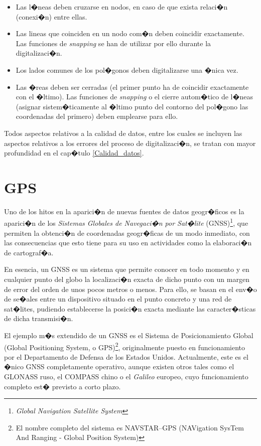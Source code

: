 \begin{itemize}
	\item Las l�neas deben cruzarse en nodos, en caso de que exista relaci�n (conexi�n) entre ellas.
	\item Las lineas que coinciden en un nodo com�n deben coincidir exactamente. Las funciones de \emph{snapping} se han de utilizar por ello durante la digitalizaci�n.
	\item Los lados comunes de los pol�gonos deben digitalizarse una �nica vez.
	\item Las �reas deben ser cerradas (el primer punto ha de coincidir exactamente con el �ltimo). Las funciones de \emph{snapping} o el cierre autom�tico de l�neas (asignar sistem�ticamente al �ltimo punto del contorno del pol�gono las coordenadas del primero) deben emplearse para ello.
\end{itemize}

Todos aspectos relativos a la calidad de datos, entre los cuales se incluyen las aspectos relativos a los errores del proceso de digitalizaci�n, se tratan con mayor profundidad en el cap�tulo \ref{Calidad_datos}.


\section{GPS}
\label{GPS}

Uno de los hitos en la aparici�n de nuevas fuentes de datos geogr�ficos es la aparici�n de los \emph{Sistemas Globales de Navegaci�n por Sat�lite} (GNSS)\footnote{\emph{Global Navigation Satellite System}}, que permiten la obtenci�n de coordenadas geogr�ficas de un modo inmediato, con las consecuencias que esto tiene para su uso en actividades como la elaboraci�n de cartograf�a.

En esencia, un GNSS es un sistema que permite conocer en todo momento y en cualquier punto del globo la localizaci�n exacta de dicho punto con un margen de error del orden de unos pocos metros o menos. Para ello, se basan en el env�o de se�ales entre un dispositivo situado en el punto concreto y una red de sat�lites, pudiendo establecerse la posici�n exacta mediante las caracter�sticas de dicha transmisi�n.

El ejemplo m�s extendido de un GNSS es el Sistema de Posicionamiento Global (Global Positioning System, o GPS)\footnote{El nombre completo del sistema es NAVSTAR--GPS (NAVigation SysTem And Ranging - Global Position System)}, originalmente puesto en funcionamiento por el Departamento de Defensa de los Estados Unidos. Actualmente, este es el �nico GNSS completamente operativo, aunque existen otros tales como el GLONASS ruso, el COMPASS chino o el \emph{Galileo} europeo, cuyo funcionamiento completo est� previsto a corto plazo. 

